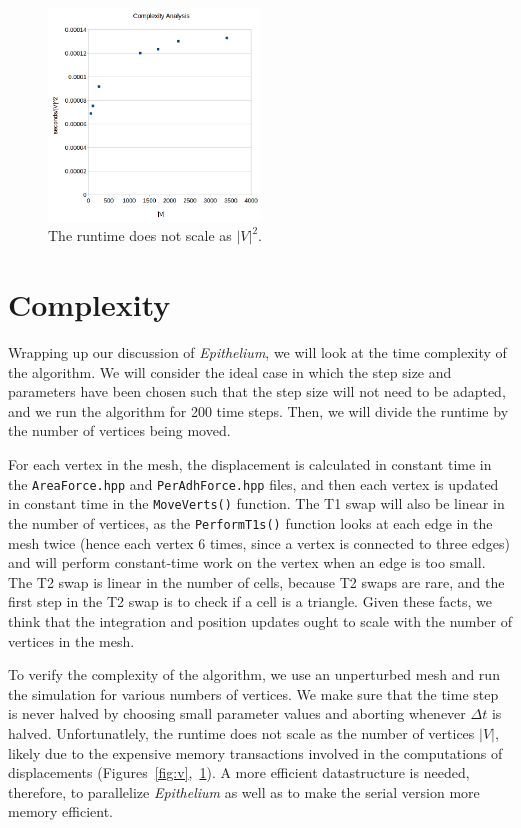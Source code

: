 \begin{figure}
\centering
\includegraphics[width=0.5\textwidth]{../diagrams/vsqrd.png}
\caption{The runtime does not scale as $|V|^2$.}
\label{fig:v2}
\end{figure}


\section{Complexity}
Wrapping up our discussion of \emph{Epithelium}, we will look at the time complexity of the algorithm. We will consider the ideal case in which the step size and parameters have been chosen such that the step size will not need to be adapted, and we run the algorithm for 200 time steps.
Then, we will divide the runtime by the number of vertices being moved.

For each vertex in the mesh, the displacement is calculated in constant time in the \texttt{AreaForce.hpp} and \texttt{PerAdhForce.hpp} files, and then each vertex is updated in constant time in the \texttt{MoveVerts()} function. The T1 swap will also be linear in  the number of vertices, as the \texttt{PerformT1s()} function looks at each edge in the mesh twice (hence each vertex 6 times, since a vertex is connected to three edges) and will perform constant-time work on the vertex when an edge is too small. The T2 swap is linear in the number of cells, because T2 swaps are rare, and the first step in the T2 swap is to check if a cell is a triangle. 
Given these facts, we think that the integration and position updates ought to scale with the number of vertices in the mesh.

 To verify the complexity of the algorithm, we use an unperturbed mesh and run the simulation for various numbers of vertices. We make sure that the time step is never halved by choosing small parameter values and aborting whenever $\Delta t$ is halved. Unfortunatlely, the runtime does not scale as the number of vertices $|V|$, likely due to the expensive memory transactions involved in the computations of displacements (Figures~\ref{fig:v},~\ref{fig:v2}). A more efficient datastructure is needed, therefore, to parallelize \emph{Epithelium} as well as to make the serial version more memory efficient.

